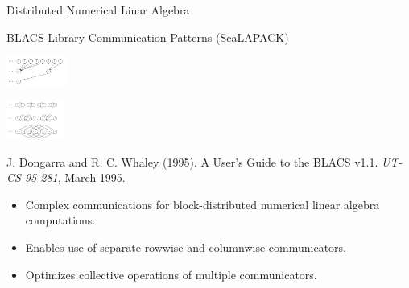 \begin{frame}{Distributed Numerical Linar Algebra}
\begin{block}{BLACS Library Communication Patterns (ScaLAPACK)}
\begin{minipage}{1.9cm}
      \includegraphics[width=2cm]{../common/pics/comm/BLACS10.png}
    \end{minipage}
    \includegraphics[width=1.9cm]{../common/pics/comm/BLACS11.png}
  \end{block}
  \begin{block}{\scriptsize J. Dongarra and R. C. Whaley (1995). A
      User’s Guide to the BLACS v1.1. {\em UT-CS-95-281}, March 1995.}
    \begin{itemize}
    \item Complex communications for block-distributed numerical
      linear algebra computations.
    \item Enables use of separate rowwise and columnwise
      communicators.
    \item Optimizes collective operations of multiple communicators.
    \end{itemize}
  \end{block}
\end{frame}


